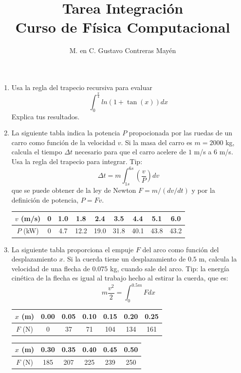 \documentclass[11pt]{article}
\title{Tarea Integración \\ Curso de Física Computacional}
\author{M. en C. Gustavo Contreras Mayén}
\date{ }
\begin{document}
\maketitle
\fontsize{14}{14}\selectfont
\begin{enumerate}
\item Usa la regla del trapecio recursiva para evaluar
\[ \int_{0}^{\frac{\pi}{4}} ln(1 + \tan(x)) dx\]
Explica tus resultados.
\item La siguiente tabla indica la potencia $P$ propocionada por las ruedas de un carro como función de la velocidad $v$. Si la masa del carro es $m=2000$ kg, calcula el tiempo $\Delta t$ necesario para que el carro acelere de $1$ m/s a $6$ m/s. Usa la regla del trapecio para integrar. Tip:
\[ \Delta t = m \int_{1s}^{6s} \left( \dfrac{v}{P} \right) dv\]
que se puede obtener de la ley de Newton $F= m/(dv/dt)$ y por la definición de potencia, $P=Fv$.
\begin{center}
\begin{tabular}{c | c | c | c | c | c | c | c | c}
$v$ (m/s) & 0 & 1.0 & 1.8 & 2.4 & 3.5 & 4.4 & 5.1 & 6.0 \\ \hline
$P$ (kW)  & 0 & 4.7 & 12.2 & 19.0 & 31.8 & 40.1 & 43.8 & 43.2 
\end{tabular}
\end{center}
\item La siguiente tabla proporciona el empuje $F$ del arco como función del desplazamiento $x$. Si la cuerda tiene un desplazamiento de $0.5$ m, calcula la velocidad de una flecha de $0.075$ kg, cuando sale del arco. Tip: la energía cinética de la flecha es igual al trabajo hecho al estirar la cuerda, que es:
\[ m \dfrac{v^{2}}{2} = \int_{0}^{0.5m} F dx\]
\begin{center}
\begin{tabular}{c | c | c | c | c | c | c |}
$x$ (m) & 0.00 & 0.05 & 0.10 & 0.15 & 0.20 & 0.25  \\ \hline
$F$ (N)  & 0 & 37 & 71 & 104 & 134 & 161
\end{tabular}
\end{center}
\begin{center}
\begin{tabular}{c | c | c | c | c | c | }
$x$ (m) & 0.30 & 0.35 & 0.40 & 0.45 & 0.50 \\ \hline
$F$ (N)  & 185 & 207 & 225 & 239 & 250 
\end{tabular}
\end{center}
\begin{figure}[H]
	\centering

\end{figure}
\end{enumerate}
\end{document}
